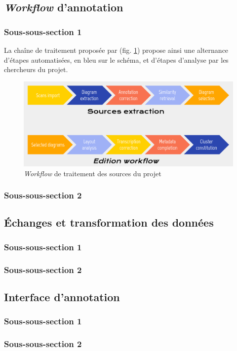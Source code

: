 
\subsection{\textit{Workflow} d'annotation}
    \subsubsection{Sous-sous-section 1}
 La chaîne de traitement proposée par \eida (fig. \ref{fig:eida_workflow}) propose ainsi une alternance d'étapes automatisées, en bleu sur le schéma, et d'étapes d'analyse par les chercheurs du projet.

\begin{figure}[h]
	\centering
	\includegraphics[width=15cm]{images/eida_workflow.png}
	\caption{\textit{Workflow} de traitement des sources du projet \eida}
	\label{fig:eida_workflow}
\end{figure}

    \subsubsection{Sous-sous-section 2}

    
    \subsection{Échanges et transformation des données}
        \subsubsection{Sous-sous-section 1}


        \subsubsection{Sous-sous-section 2}


    \subsection{Interface d’annotation}
        \subsubsection{Sous-sous-section 1}


        \subsubsection{Sous-sous-section 2}

